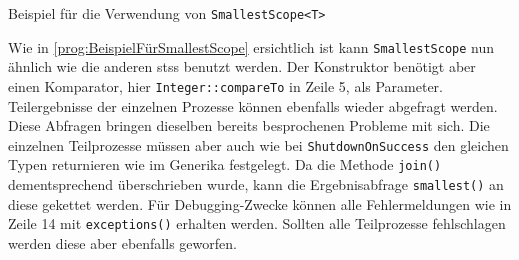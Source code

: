     \begin{program} [H]
        \caption{Beispiel für die Verwendung von \texttt{SmallestScope<T>}}
        \label{prog:VerwendungVonSmallestScope}
    \begin{JavaCode}[language=Java, numbers=left]
public static void scopesSmallest() {
    StructuredTaskScope.Subtask<Integer> result1 = null;
    Integer result = null;

    try (var scope = new SmallestScope<Integer>(Integer::compareTo)) {                                         
        result1 = scope.fork(() -> { Thread.sleep(1000); return 4; });
        scope.fork(() -> { throw new RuntimeException("Task 2 failed"); });
        scope.fork(() -> { Thread.sleep(2000); return 3; });

        result = scope.join().smallest();
        if (result1.state() == StructuredTaskScope.Subtask.State.SUCCESS) {
            System.out.println(STR."result from the 1st Thread: \{result1.get()}");
        }
        scope.exceptions().printStackTrace();
    } catch (Exception e) {
        e.printStackTrace();
    }
    System.out.println(STR."smallest result: \{result}");
}\end{JavaCode}
    \end{program}
    Wie in \ref{prog:BeispielFürSmallestScope} ersichtlich ist kann \texttt{SmallestScope} nun ähnlich wie die anderen \Glspl{sts} benutzt werden. Der Konstruktor benötigt
    aber einen Komparator, hier \texttt{Integer::compareTo} in Zeile 5, als Parameter. Teilergebnisse der einzelnen Prozesse können ebenfalls wieder abgefragt werden. Diese Abfragen
    bringen dieselben bereits besprochenen Probleme mit sich. Die einzelnen Teilprozesse müssen 
    aber auch wie bei \texttt{ShutdownOnSuccess} den gleichen Typen returnieren wie im Generika festgelegt. Da die Methode \texttt{join()} dementsprechend überschrieben
    wurde, kann die Ergebnisabfrage \texttt{smallest()} an diese gekettet werden. Für Debugging-Zwecke können alle Fehlermeldungen wie in Zeile 14 mit \texttt{exceptions()}
    erhalten werden. Sollten alle Teilprozesse fehlschlagen werden diese aber ebenfalls geworfen. 






